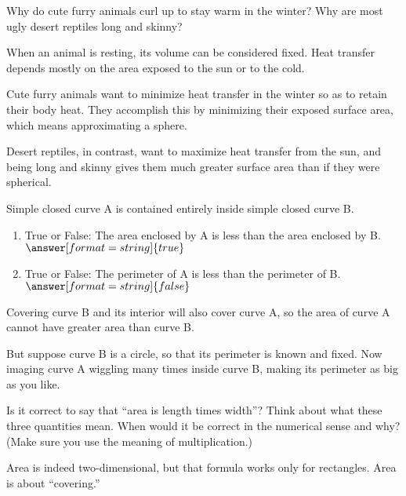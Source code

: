 \documentclass[nooutcomes]{ximera}
\begin{document}
\begin{problem}
Why do cute furry animals curl up to stay warm in the winter?  Why are most ugly desert reptiles long and skinny?

\begin{freeResponse}
\end{freeResponse}
\begin{hint}
When an animal is resting, its volume can be considered fixed.  Heat transfer depends mostly on the area exposed to the sun or to the cold.  

Cute furry animals want to minimize heat transfer in the winter so as to retain their body heat.  They accomplish this by minimizing their exposed surface area, which means approximating a sphere. 

Desert reptiles, in contrast, want to maximize heat transfer from the sun, and being long and skinny gives them much greater surface area than if they were spherical.  
\end{hint}
\end{problem}

\begin{problem}Simple closed curve A is contained entirely inside simple closed curve B.  
\begin{enumerate}
\item True or False:  The area enclosed by A is less than the area enclosed by B. 
$\answer[format=string]{true}$
\item True or False:  The perimeter of A is less than the perimeter of B.   
$\answer[format=string]{false}$
\end{enumerate}
\begin{feedback}[correct]
Covering curve B and its interior will also cover curve A, so the area of curve A cannot have greater area than curve B. 

But suppose curve B is a circle, so that its perimeter is known and fixed.  Now imaging curve A wiggling many times inside curve B, making its perimeter as big as you like.  
\end{feedback}
\end{problem}

\begin{problem}
Is it correct to say that ``area is length times width''?  Think about what these three quantities mean.  When would it be correct in the numerical sense and why?  (Make sure you use the meaning of multiplication.)   
\begin{freeResponse}
\end{freeResponse}
\begin{hint}
Area is indeed two-dimensional, but that formula works only for rectangles.  Area is about ``covering.''
\end{hint}
\end{problem}
\end{document}
